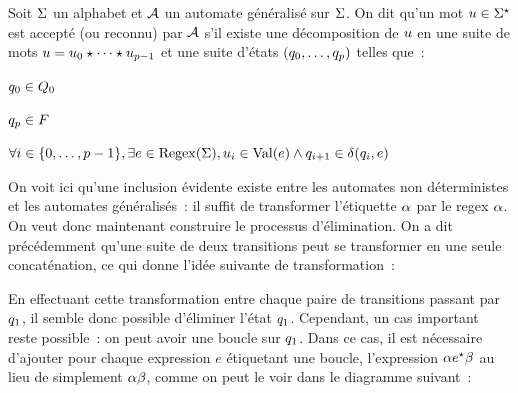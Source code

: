 \begin{definition}
  Soit $\Sigma$ un alphabet et $\mathcal{A}$ un automate généralisé sur $\Sigma$. On dit
  qu'un mot $u\in \Sigma^{\star}$ est accepté (ou reconnu) par $\mathcal{A}$ s'il
  existe une décomposition de $u$ en une suite de mots
  $u = u_0\mathbin{\star}\cdots\mathbin{\star} u_{p-1}$ et une suite d'états
  $(q_{0},\ldots,q_{p})$ telles que~:
  \begin{itemize}
    \begin{minipage}{0.45\textwidth}
    \item $q_{0} \in Q_{0}$
    \end{minipage}
    \begin{minipage}{0.45\textwidth}
    \item $q_{p} \in F_{}$
    \end{minipage}
  \item $\forall i \in \{0,\ldots,p - 1\}, \exists e \in \operatorname{Regex}(\Sigma),
    u_i \in \operatorname{Val}(e) \land q_{i+1}\in \delta_{}(q_{i},e)$
  \end{itemize}
\end{definition}

On voit ici qu'une inclusion évidente existe entre les automates non
déterministes et les automates généralisés~: il suffit de transformer
l'étiquette $\alpha$ par le regex $\alpha$. On veut donc maintenant construire
le processus d'élimination. On a dit précédemment qu'une suite de deux
transitions peut se transformer en une seule concaténation, ce qui donne l'idée
suivante de transformation~:

\begin{figure}[H]
  \centering
\end{figure}

En effectuant cette transformation entre chaque paire de transitions passant par
$q_{1}$, il semble donc possible d'éliminer l'état $q_{1}$. Cependant,
un cas important reste possible~: on peut avoir une boucle sur $q_{1}$. Dans
ce cas, il est nécessaire d'ajouter pour chaque expression $e$ étiquetant une
boucle, l'expression $\alpha e^{\star}\beta$ au lieu de simplement
$\alpha\beta$, comme on peut le voir dans le diagramme suivant~:

